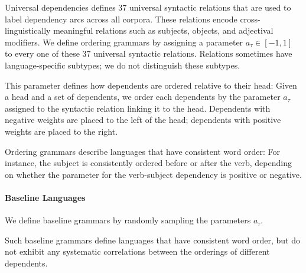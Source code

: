 \documentclass[11pt,letterpaper]{article}
\begin{document}
Universal dependencies defines 37 universal syntactic relations that are used to label dependency arcs across all corpora.
These relations encode cross-linguistically meaningful relations such as subjects, objects, and adjectival modifiers.
We define ordering grammars by assigning a parameter $a_\tau \in [-1,1]$ to every one of these 37 universal syntactic relations.
Relations sometimes have language-specific subtypes; we do not distinguish these subtypes.

This parameter defines how dependents are ordered relative to their head:
Given a head and a set of dependents, we order each dependents by the parameter $a_\tau$ assigned to the syntactic relation linking it to the head.
Dependents with negative weights are placed to the left of the head; dependents with positive weights are placed to the right.

Ordering grammars describe languages that have consistent word order:
For instance, the subject is consistently ordered before or after the verb, depending on whether the parameter for the verb-subject dependency is positive or negative.


\paragraph{Baseline Languages}
We define baseline grammars by randomly sampling the parameters $a_\tau$.

Such baseline grammars define languages that have consistent word order, but do not exhibit any systematic correlations between the orderings of different dependents.
\end{document}
